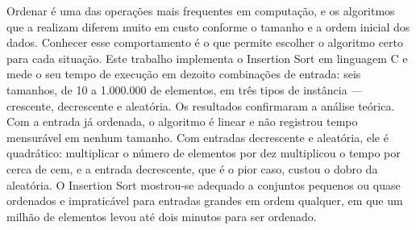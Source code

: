 
\indent \qquad Ordenar é uma das operações mais frequentes em computação, e os
algoritmos que a realizam diferem muito em custo conforme o tamanho e a ordem
inicial dos dados. Conhecer esse comportamento é o que permite escolher o
algoritmo certo para cada situação. Este trabalho implementa o Insertion Sort
em linguagem C e mede o seu tempo de execução em dezoito combinações de entrada:
seis tamanhos, de 10 a 1.000.000 de elementos, em três tipos de instância ---
crescente, decrescente e aleatória. Os resultados confirmaram a análise teórica.
Com a entrada já ordenada, o algoritmo é linear e não registrou tempo mensurável
em nenhum tamanho. Com entradas decrescente e aleatória, ele é quadrático:
multiplicar o número de elementos por dez multiplicou o tempo por cerca de cem,
e a entrada decrescente, que é o pior caso, custou o dobro da aleatória. O
Insertion Sort mostrou-se adequado a conjuntos pequenos ou quase ordenados e
impraticável para entradas grandes em ordem qualquer, em que um milhão de
elementos levou até dois minutos para ser ordenado.
